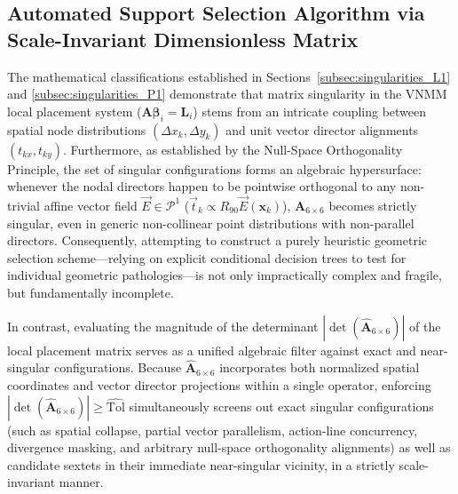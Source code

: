 \documentclass[preprint,12pt]{elsarticle}
\begin{document}
\subsection{Automated Support Selection Algorithm via Scale-Invariant Dimensionless Matrix}
\label{sec:support_selection_algorithm}

The mathematical classifications established in Sections~\ref{subsec:singularities_L1} and \ref{subsec:singularities_P1} demonstrate that matrix singularity in the VNMM local placement system ($\mathbf{A} \boldsymbol{\beta}_i = \mathbf{L}_i$) stems from an intricate coupling between spatial node distributions $(\Delta x_k, \Delta y_k)$ and unit vector director alignments $(t_{kx}, t_{ky})$. Furthermore, as established by the Null-Space Orthogonality Principle, the set of singular configurations forms an algebraic hypersurface: whenever the nodal directors happen to be pointwise orthogonal to any non-trivial affine vector field $\vec{E} \in \mathcal{P}^1$ ($\vec{t}_k \propto R_{90} \vec{E}(\mathbf{x}_k)$), $\mathbf{A}_{6 \times 6}$ becomes strictly singular, even in generic non-collinear point distributions with non-parallel directors. Consequently, attempting to construct a purely heuristic geometric selection scheme---relying on explicit conditional decision trees to test for individual geometric pathologies---is not only impractically complex and fragile, but fundamentally incomplete.

In contrast, evaluating the magnitude of the determinant $|\det(\widehat{\mathbf{A}}_{6\times6})|$ of the local placement matrix serves as a unified algebraic filter against exact and near-singular configurations. Because $\widehat{\mathbf{A}}_{6\times6}$ incorporates both normalized spatial coordinates and vector director projections within a single operator, enforcing $|\det(\widehat{\mathbf{A}}_{6\times6})| \ge \widehat{\mathrm{Tol}}$ simultaneously screens out exact singular configurations (such as spatial collapse, partial vector parallelism, action-line concurrency, divergence masking, and arbitrary null-space orthogonality alignments) as well as candidate sextets in their immediate near-singular vicinity, in a strictly scale-invariant manner.

\end{document}

